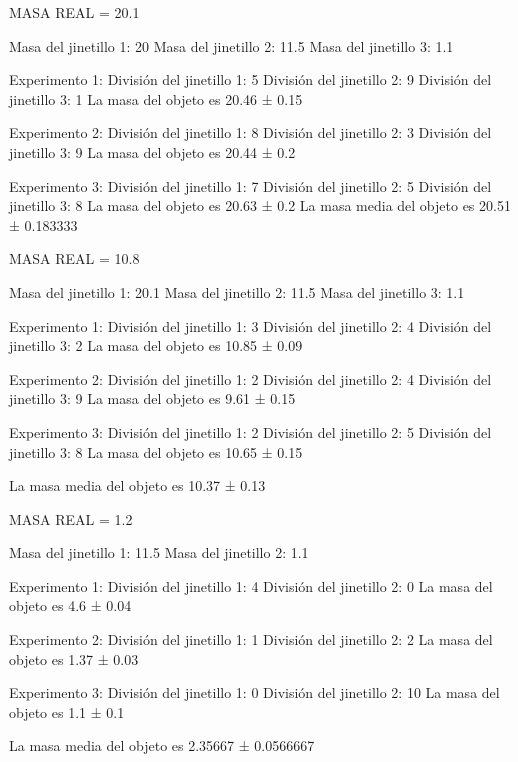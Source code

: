 

MASA REAL = 20.1

Masa del jinetillo 1: 20
Masa del jinetillo 2: 11.5
Masa del jinetillo 3: 1.1

Experimento 1:
División del jinetillo 1: 5
División del jinetillo 2: 9
División del jinetillo 3: 1
La masa del objeto es 20.46 ± 0.15

Experimento 2:
División del jinetillo 1: 8
División del jinetillo 2: 3 
División del jinetillo 3: 9
La masa del objeto es 20.44 ± 0.2

Experimento 3:
División del jinetillo 1: 7
División del jinetillo 2: 5
División del jinetillo 3: 8
La masa del objeto es 20.63 ± 0.2
La masa media del objeto es 20.51 ± 0.183333



MASA REAL = 10.8

Masa del jinetillo 1: 20.1
Masa del jinetillo 2: 11.5
Masa del jinetillo 3: 1.1

Experimento 1:
División del jinetillo 1: 3
División del jinetillo 2: 4
División del jinetillo 3: 2
La masa del objeto es 10.85 ± 0.09

Experimento 2:
División del jinetillo 1: 2
División del jinetillo 2: 4
División del jinetillo 3: 9
La masa del objeto es 9.61 ± 0.15

Experimento 3:
División del jinetillo 1: 2
División del jinetillo 2: 5
División del jinetillo 3: 8
La masa del objeto es 10.65 ± 0.15

La masa media del objeto es 10.37 ± 0.13



MASA REAL = 1.2

Masa del jinetillo 1: 11.5
Masa del jinetillo 2: 1.1

Experimento 1:
División del jinetillo 1: 4
División del jinetillo 2: 0
La masa del objeto es 4.6 ± 0.04

Experimento 2:
División del jinetillo 1: 1
División del jinetillo 2: 2
La masa del objeto es 1.37 ± 0.03

Experimento 3:
División del jinetillo 1: 0
División del jinetillo 2: 10
La masa del objeto es 1.1 ± 0.1

La masa media del objeto es 2.35667 ± 0.0566667




